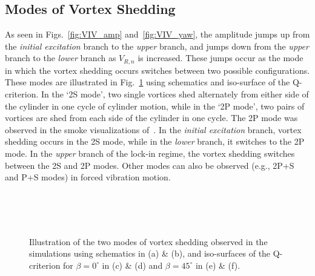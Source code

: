 \subsection{Modes of Vortex Shedding}
\label{sec:VIVmodes}
%
As seen in Figs.~\ref{fig:VIV_amp} and~\ref{fig:VIV_yaw}, the amplitude jumps
up from the {\em initial excitation} branch to the {\em upper} branch, and
jumps down from the {\em upper} branch to the {\em lower} branch as $V_{R,n}$
is increased. These jumps occur as the mode in which the vortex shedding occurs
switches between two possible configurations. These modes are illustrated in
Fig.~\ref{fig:VIV_Q} using schematics and iso-surface of the Q-criterion.
In the `2S mode', two single vortices shed alternately from either
side of the cylinder in one cycle of cylinder motion, while in the `2P mode',
two pairs of vortices are shed from each side of the cylinder in one cycle.
The 2P mode was observed in the smoke visualizations of~\citet{brika1993vortex}.
In the {\em initial excitation} branch, vortex shedding occurs in the 2S mode,
while in the {\em lower} branch, it switches to the 2P mode. In the {\em
upper} branch of the lock-in regime, the vortex shedding switches between the
2S and 2P modes. Other modes can also be observed (e.g., 2P+S and P+S modes) in
forced vibration motion.
%
\begin{figure}[htb!]
   \qquad
   \\
%
   \qquad
   \\
%
   \qquad
   \\
    \caption{Illustration of the two modes of vortex shedding observed in the
    simulations using schematics in (a) \& (b), and iso-surfaces of the
    Q-criterion for $\beta=0^\circ$ in (c) \& (d) and $\beta=45^\circ$ in (e) \&
    (f).}
  \label{fig:VIV_Q}
\end{figure}
%
